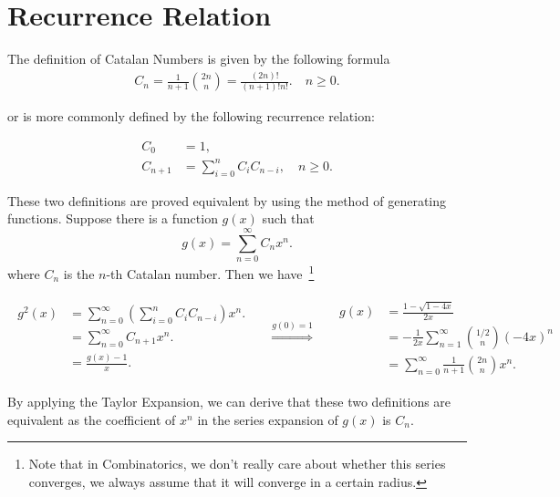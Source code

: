 \section{Recurrence Relation}
The definition of Catalan Numbers is given by the following formula
\[
    \begin{aligned}
        C_n = \frac{1}{n+1}\binom{2n}{n} = \frac{(2n)!}{(n+1)!n!}.\quad n \geq 0.
    \end{aligned}
\]

or is more commonly defined by the following recurrence relation:

\[
    \begin{aligned}
        C_0     & = 1,                                          \\
        C_{n+1} & = \sum_{i=0}^{n} C_i C_{n-i}, \quad n \geq 0.
    \end{aligned}
\]

These two definitions are proved equivalent by using the method of generating functions.
Suppose there is a function $g(x)$ such that
\[
    g(x) = \sum_{n=0}^{\infty} C_n x^n.
\]
where $C_n$ is the $n$-th Catalan number. Then we have~\footnote[1]{Note that in Combinatorics, we don't really care about whether this series converges, we always assume that it will converge in a certain radius.}

\[
    \begin{split}
        \begin{aligned}
            g^2(x)
             & = \sum_{n=0}^{\infty} \left(\sum_{i=0}^{n} C_i C_{n-i}\right) x^n. \\
             & = \sum_{n=0}^{\infty} C_{n+1} x^n.                                 \\
             & = \frac{g(x) - 1}{x}.
        \end{aligned}
    \end{split}
    \quad \stackrel{g(0)=1}{\Longrightarrow} \quad
    \begin{split}
        \begin{aligned}
            g(x)
             & = \frac{1 - \sqrt{1 - 4x}}{2x}                               \\
             & = -\frac{1}{2x}\sum_{n=1}^{\infty}\binom{1 / 2}{n}(-4 x)^{n} \\
             & = \sum_{n=0}^{\infty} \frac{1}{n+1}\binom{2n}{n}x^n.
        \end{aligned}
    \end{split}
\]


\noindent By applying the Taylor Expansion, we can derive that these two definitions are equivalent as the coefficient of $x^n$ in the series expansion of $g(x)$ is $C_n$.